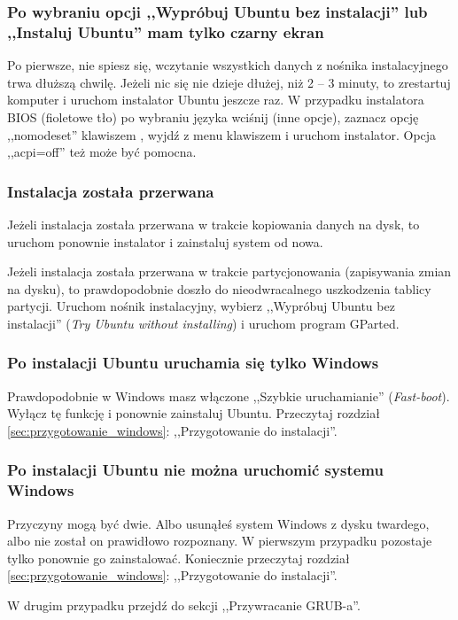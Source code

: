 \subsubsection{Po wybraniu opcji ,,Wypróbuj Ubuntu bez instalacji'' lub ,,Instaluj Ubuntu'' mam tylko czarny ekran}
Po pierwsze, nie spiesz się, wczytanie wszystkich danych z nośnika instalacyjnego trwa dłuższą chwilę. Jeżeli nic się nie dzieje dłużej, niż 2 -- 3 minuty, to zrestartuj komputer i uruchom instalator Ubuntu jeszcze raz. W przypadku instalatora BIOS (fioletowe tło) po wybraniu języka wciśnij  (inne opcje), zaznacz opcję ,,nomodeset'' klawiszem \keys{\returnwin}, wyjdź z menu klawiszem  i uruchom instalator. Opcja ,,acpi=off'' też może być pomocna.

\subsubsection{Instalacja została przerwana}
Jeżeli instalacja została przerwana w trakcie kopiowania danych na dysk, to uruchom ponownie instalator i zainstaluj system od nowa.

Jeżeli instalacja została przerwana w trakcie partycjonowania (zapisywania zmian na dysku), to prawdopodobnie doszło do nieodwracalnego uszkodzenia tablicy partycji. Uruchom nośnik instalacyjny, wybierz ,,Wypróbuj Ubuntu bez instalacji'' (\textit{Try Ubuntu without installing}) i uruchom program GParted.

\subsubsection{Po instalacji Ubuntu uruchamia się tylko Windows}
Prawdopodobnie w Windows masz włączone ,,Szybkie uruchamianie'' (\textit{Fast-boot}). Wyłącz tę funkcję i ponownie zainstaluj Ubuntu. Przeczytaj rozdział \ref{sec:przygotowanie_windows}: ,,Przygotowanie do instalacji''.

\subsubsection{Po instalacji Ubuntu nie można uruchomić systemu Windows}
Przyczyny mogą być dwie. Albo usunąłeś system Windows z dysku twardego, albo nie został on prawidłowo rozpoznany. W pierwszym przypadku pozostaje tylko ponownie go zainstalować. Koniecznie przeczytaj rozdział \ref{sec:przygotowanie_windows}: ,,Przygotowanie do instalacji''.

W drugim przypadku przejdź do sekcji ,,Przywracanie GRUB-a''.

